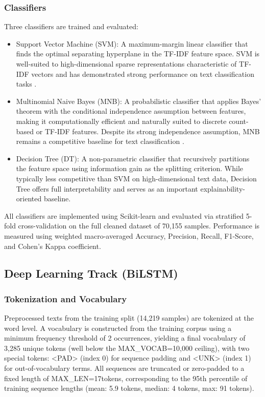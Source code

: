 \documentclass{article}
\begin{document}
\subsubsection{Classifiers}
Three classifiers are trained and evaluated:
\begin{itemize}
    \item {Support Vector Machine (SVM)}: A maximum-margin linear classifier that finds the optimal separating hyperplane in the TF-IDF feature space. SVM is well-suited to high-dimensional sparse representations characteristic of TF-IDF vectors and has demonstrated strong performance on text classification tasks \cite{pang2008opinion, pratap2020comparative}.
    \item {Multinomial Naive Bayes (MNB)}: A probabilistic classifier that applies Bayes' theorem with the conditional independence assumption between features, making it computationally efficient and naturally suited to discrete count-based or TF-IDF features. Despite its strong independence assumption, MNB remains a competitive baseline for text classification \cite{pang2008opinion}.
    \item {Decision Tree (DT)}: A non-parametric classifier that recursively partitions the feature space using information gain as the splitting criterion. While typically less competitive than SVM on high-dimensional text data, Decision Tree offers full interpretability and serves as an important explainability-oriented baseline.
\end{itemize}

All classifiers are implemented using Scikit-learn and evaluated via stratified 5-fold cross-validation on the full cleaned dataset of 70,155 samples. Performance is measured using weighted macro-averaged Accuracy, Precision, Recall, F1-Score, and Cohen's Kappa coefficient.

\subsection{Deep Learning Track (BiLSTM)}
\subsubsection{Tokenization and Vocabulary}
Preprocessed texts from the training split (14,219 samples) are tokenized at the word level. A vocabulary is constructed from the training corpus using a minimum frequency threshold of 2 occurrences, yielding a final vocabulary of 3,285 unique tokens (well below the MAX\_VOCAB=10,000 ceiling), with two special tokens: <PAD> (index 0) for sequence padding and <UNK> (index 1) for out-of-vocabulary terms. All sequences are truncated or zero-padded to a fixed length of MAX\_LEN=17tokens, corresponding to the 95th percentile of training sequence lengths (mean: 5.9 tokens, median: 4 tokens, max: 91 tokens).
\end{document}

